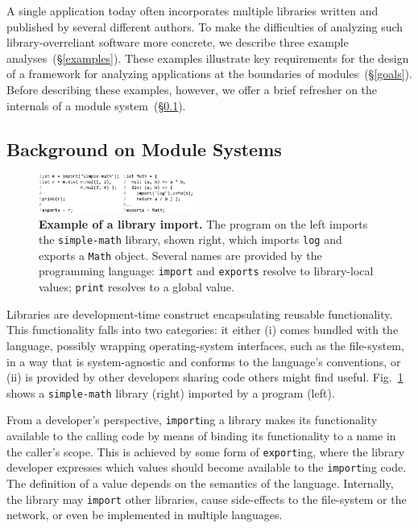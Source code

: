 \documentclass[letterpaper,twocolumn,10pt]{article}
\newcommand{\ttt}[1]{\texttt{#1}}
\newcommand{\sx}[1]{(\S\ref{#1})}
\begin{document}
A single application today often incorporates multiple libraries written and published by several different authors.
To make the difficulties of analyzing such library-overreliant software more concrete, we describe three example analyses~\sx{examples}.
These examples illustrate key requirements for the design of a framework for analyzing applications at the boundaries of modules~\sx{goals}.
Before describing these examples, however, we offer a brief refresher on the %
  internals of a module system~\sx{bg1}.

\subsection{Background on Module Systems}
\label{bg1}

\begin{figure}[t]
\raggedleft 
\includegraphics[width=0.45\textwidth]{./figs/lya_ex1.pdf}
\caption{
  \textbf{Example of a library import.}
  \textmd{
    The program on the left imports the \ttt{simple-math} library, shown right, which imports \ttt{log} and exports a \ttt{Math} object.
    Several names are provided by the programming language:
      \ttt{import} and \ttt{exports} resolve to library-local values; \ttt{print} resolves to a global value.
  }
  \vspace{-8mm}
}
\label{fig:ex1}
\end{figure}


Libraries are development-time construct encapsulating reusable functionality.
This functionality falls into two categories:
  it either (i) comes bundled with the language, possibly wrapping operating-system interfaces, such as the file-system, in a way that is system-agnostic and conforms to the language's conventions,
  or (ii) is provided by other developers sharing code others might find useful.
Fig.~\ref{fig:ex1} shows a \ttt{simple-math} library (right) imported by a program (left).

From a developer's perspective, \ttt{import}ing a library makes its functionality available to the calling code by means of binding its functionality to a name in the caller's scope.
This is achieved by some form of \ttt{export}ing, where the library developer expresses which values should become available to the \ttt{import}ing code.
The definition of a value depends on the semantics of the language. 
Internally, the library may \ttt{import} other libraries, cause side-effects to the file-system or the network, or even be implemented in multiple languages.
\end{document}
